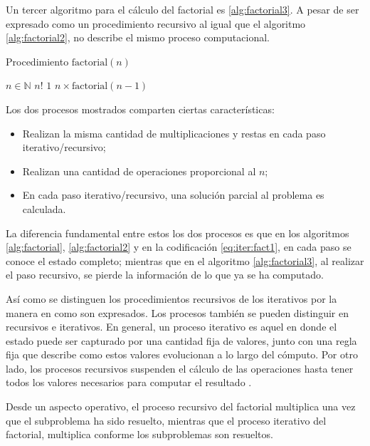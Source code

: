 Un tercer algoritmo para el cálculo del factorial es \ref{alg:factorial3}. A pesar de ser expresado como un procedimiento recursivo al igual que el algoritmo \ref{alg:factorial2}, no describe el mismo proceso computacional.

\begin{algorithm}
  \caption{Procedimiento \( \mathrm{factorial}(n) \)}
  \label{alg:factorial3}
  \begin{algorithmic}
    \REQUIRE \( n\in \mathbb{N} \)
    \ENSURE \( n! \)
    \RETURN \( 1 \)
    \ELSE
    \RETURN \( n\times \mathrm{factorial}(n-1) \)
    \ENDIF
  \end{algorithmic}
\end{algorithm}

Los dos procesos mostrados comparten ciertas características:

\begin{itemize}
\item Realizan la misma cantidad de multiplicaciones y restas en cada paso iterativo/recursivo;
\item Realizan una cantidad de operaciones proporcional al \( n \);
\item En cada paso iterativo/recursivo, una solución parcial al problema es calculada.
\end{itemize}

La diferencia fundamental entre estos los dos procesos es que en los algoritmos \ref{alg:factorial}, \ref{alg:factorial2} y en la codificación \eqref{eq:iter:fact1}, en cada paso se conoce el estado completo; mientras que en el algoritmo \ref{alg:factorial3}, al realizar el paso recursivo, se pierde la información de lo que ya se ha computado.

Así como se distinguen los procedimientos recursivos de los iterativos por la manera en como son expresados. Los procesos también se pueden distinguir en recursivos e iterativos. En general, un proceso iterativo es aquel en donde el estado puede ser capturado por una cantidad fija de valores, junto con una regla fija que describe como estos valores evolucionan a lo largo del cómputo. Por otro lado, los procesos recursivos suspenden el cálculo de las operaciones hasta tener todos los valores necesarios para computar el resultado \cite{AbelsonSussman:Wizard}.

Desde un aspecto operativo, el proceso recursivo del factorial multiplica una vez que el subproblema ha sido resuelto, mientras que el proceso iterativo del factorial, multiplica conforme los subproblemas son resueltos.

